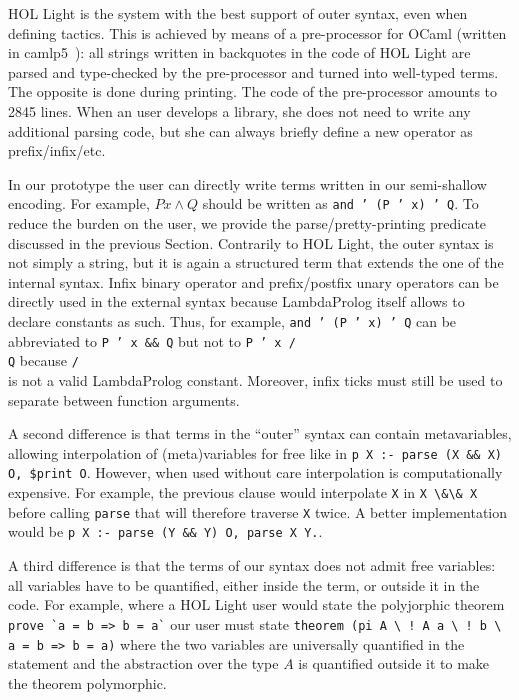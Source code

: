 \documentclass[preprint]{sigplanconf}
\begin{document}
HOL Light is the system with the best support of outer syntax, even when defining tactics. This is achieved by means of a pre-processor for OCaml (written in camlp5~\cite{?}): all strings written in backquotes in the code of HOL Light are parsed and type-checked by the pre-processor and turned into well-typed terms. The opposite is done during printing. The code of the pre-processor amounts to 2845 lines. When an user develops a library, she does not need to write any additional parsing code, but she can always briefly define a new operator as prefix/infix/etc.

In our prototype the user can directly write terms written in our semi-shallow encoding. For example, $P x \wedge Q$ should be written as \texttt{and ' (P ' x) ' Q}. To reduce the burden on the user, we provide the parse/pretty-printing predicate discussed in the previous Section. Contrarily to HOL Light, the outer syntax is not simply a string, but it is again a structured term that extends the one of the internal syntax. Infix binary operator and prefix/postfix unary operators can be directly used in the external syntax because LambdaProlog itself allows to declare constants as such. Thus, for example, \texttt{and ' (P ' x) ' Q} can be abbreviated to \texttt{P ' x \&\& Q} but not to \texttt{P ' x /\\ Q} because \texttt{/\\} is not a valid LambdaProlog constant. Moreover, infix ticks must still be used to separate between function arguments.

A second difference  is that terms in the ``outer'' syntax can contain metavariables, allowing interpolation of (meta)variables for free like in \texttt{p X :- parse (X \&\& X) O, \$print O}. However, when used without care interpolation is computationally expensive. For example, the previous clause would interpolate \verb+X+ in \verb+X \&\& X+ before calling \verb+parse+ that will therefore traverse \verb+X+ twice. A better implementation would be \texttt{p X :- parse (Y \&\& Y) O, parse X Y.}.

A third difference is that the terms of our syntax does not admit free variables: all variables have to be quantified, either inside the term, or outside it in the code. For example, where a HOL Light user would state the polyjorphic theorem \verb+ prove `a = b => b = a`+ our user must state \verb+theorem (pi A \ ! A a \ ! b \ a = b => b = a)+ where the two variables are universally quantified in the statement and the abstraction over the type $A$ is quantified outside it to make the theorem polymorphic.
\end{document}
